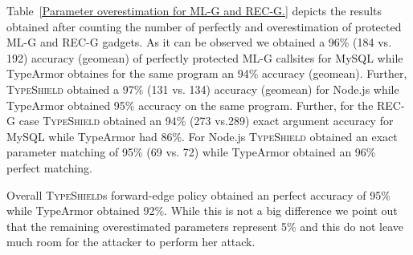 \begin{table}[H]
\centering 
{}
\caption{Parameter overestimation for ML-G and REC-G.}
\label{Parameter overestimation for ML-G and REC-G.}

\vspace{-.5cm}
\end{table}
Table~\ref{Parameter overestimation for ML-G and REC-G.} depicts the results obtained
after counting the number of perfectly and overestimation of protected ML-G and 
REC-G gadgets. As it can be observed we obtained a
96\% (184 vs. 192) accuracy (geomean) of perfectly protected ML-G callsites for MySQL while
TypeArmor obtaines for the same program an 94\% accuracy (geomean). Further,
\textsc{TypeShield} obtained a 97\% (131 vs. 134) accuracy (geomean) for Node.js while TypeArmor
obtained 95\% accuracy on the same program.
Further, for the REC-G case \textsc{TypeShield} obtained an
94\% (273 vs.289) exact argument accuracy for MySQL while TypeArmor had 86\%.
For Node.js \textsc{TypeShield} obtained an exact parameter 
matching of 95\% (69 vs. 72) while TypeArmor obtained an 96\% perfect matching.

Overall \textsc{TypeShield}s forward-edge policy obtained an perfect accuracy 
of 95\% while TypeArmor obtained 92\%. While this is not a big difference
we point out that the remaining overestimated parameters represent 5\% and this 
do not leave much room for the attacker to perform her attack.

